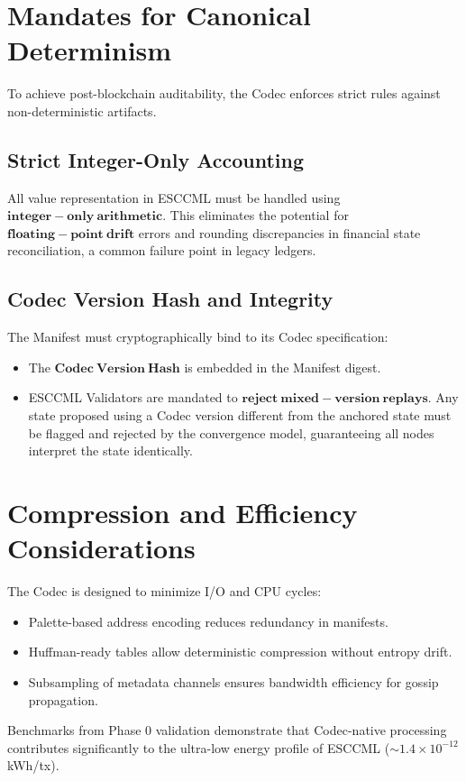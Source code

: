 \documentclass[11pt, a4paper]{article}
\begin{document}
\section{Mandates for Canonical Determinism}
To achieve post-blockchain auditability, the Codec enforces strict rules against
non-deterministic artifacts.

\subsection{Strict Integer-Only Accounting}
All value representation in ESCCML must be handled using $\mathbf{integer-only\ arithmetic}$.
This eliminates the potential for $\mathbf{floating-point\ drift}$ errors and rounding
discrepancies in financial state reconciliation, a common failure point in legacy ledgers.

\subsection{Codec Version Hash and Integrity}
The Manifest must cryptographically bind to its Codec specification:
\begin{itemize}
    \item The $\mathbf{Codec\ Version\ Hash}$ is embedded in the Manifest digest.
    \item ESCCML Validators are mandated to $\mathbf{reject\ mixed-version\ replays}$.
    Any state proposed using a Codec version different from the anchored state must be flagged
    and rejected by the convergence model, guaranteeing all nodes interpret the state identically.
\end{itemize}

\section{Compression and Efficiency Considerations}
The Codec is designed to minimize I/O and CPU cycles:
\begin{itemize}
    \item Palette-based address encoding reduces redundancy in manifests.
    \item Huffman-ready tables allow deterministic compression without entropy drift.
    \item Subsampling of metadata channels ensures bandwidth efficiency for gossip propagation.
\end{itemize}
Benchmarks from Phase 0 validation demonstrate that Codec-native processing contributes
significantly to the ultra-low energy profile of ESCCML ($\sim 1.4 \times 10^{-12}$ kWh/tx).
\end{document}
